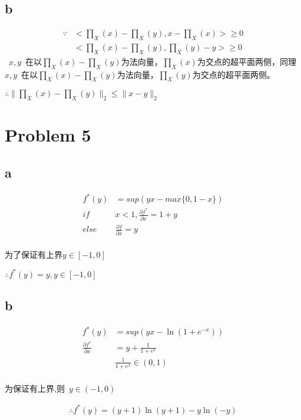 \documentclass[12pt,a4paper,fontset=none]{ctexart}
\begin{document}
\subsection{b}
\begin{align*}
	\because & <\prod_X(x)-\prod_X(y),x-\prod_X(x)> \geq 0 \\
	         & <\prod_X(x)-\prod_X(y),\prod_X(y)-y> \geq 0
\end{align*}
~$x,y$~在以$\prod_X(x)-\prod_X(y)$为法向量，$\prod_X(x)$为交点的超平面两侧，同理~$x,y$~在以$\prod_X(x)-\prod_X(y)$为法向量，$\prod_X(y)$为交点的超平面两侧。

$\therefore \|\prod_X(x)-\prod_X(y)\|_2\leq \|x-y\|_2$
\section{Problem 5}
\subsection{a}
\begin{align*}
	f^*(y)        & =sup(yx-max\{0,1-x\})                   \\
	if \text{ }   & x<1,\frac{\partial f^*}{\partial x}=1+y \\
	else \text{ } & \frac{\partial f}{\partial x}=y         \\
\end{align*}

为了保证有上界$y\in [-1,0]$

$\therefore f^*(y)=y,y\in [-1,0]$
\subsection{b}
\begin{align*}
	f^*(y)                          & =sup(yx-\ln (1+e^{-x}))   \\
	\frac{\partial f^*}{\partial x} & =y+\frac{1}{1+e^{x} }     \\
	                                & \frac{1}{1+e^x} \in (0,1) \\
\end{align*}

为保证有上界,则~$y\in (-1,0)$~

\begin{align*}
	\therefore f^*(y)=(y+1)\ln (y+1)-y\ln(-y)
\end{align*}
\end{document}
